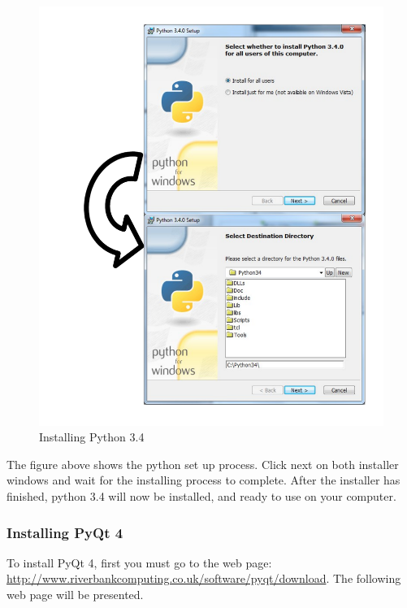 \begin{figure}[H]
    \includegraphics[width=\textwidth]{./Manual/Images/InstallingPython.pdf}
    \caption{Installing Python 3.4} \label{fig:InstallingPython}
\end{figure}

The figure above shows the python set up process. Click next on both installer windows and wait for the installing process to complete. After the installer has finished, python 3.4 will now be installed, and ready to use on your computer.

\subsubsection{Installing PyQt 4}

To install PyQt 4, first you must go to the web page: \url{http://www.riverbankcomputing.co.uk/software/pyqt/download}. The following web page will be presented.

